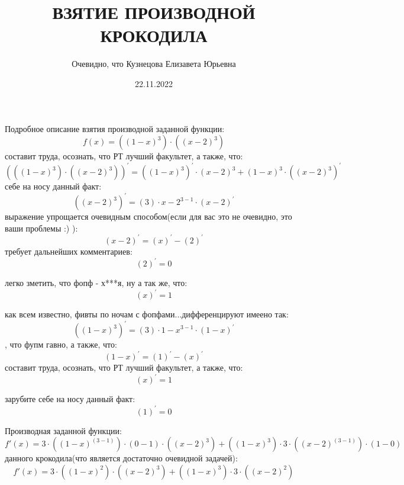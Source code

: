 \documentclass[12pt, letterpaper, twoside]{article}
\title{ВЗЯТИЕ ПРОИЗВОДНОЙ КРОКОДИЛА}
\author{Очевидно, что Кузнецова Елизавета Юрьевна}
\date{22.11.2022}
\begin{document}
\maketitle
\newpage
Подробное описание взятия производной заданной функции:
\[f(x) ={{({({1} - {x})}^{3})} \cdot {({({x} - {2})}^{3})}}\]\newline{} составит труда, осознать, что РТ лучший факультет, а также, что:\newline\newline\[{({{({({1} - {x})}^{3})} \cdot {({({x} - {2})}^{3})}})}^{'} = {({{({1} - {x})}^{3}})}^{'}\cdot {{({x} - {2})}^{3}} + {{({1} - {x})}^{3}}\cdot {({{({x} - {2})}^{3}})}^{'}\]
 себе на носу данный факт:\newline\newline\[{({{({x} - {2})}^{3}})}^{'} = ({3})\cdot {{{x} - {2}}}^{{3} - 1} \cdot{({{x} - {2}})}^{'}\]
 выражение упрощается очевидным способом(если для вас это не очевидно, это ваши проблемы :) ):\newline\newline\[{({{x} - {2}})}^{'} = {({x})}^{'} - {({2})}^{'}\]
 требует дальнейших комментариев:\newline
\[{(2)}^{'} = 0 \]

легко зметить, что фопф - х***я, ну а так же, что:\newline
\[{(x)}^{'} = 1 \]

как всем известно, фивты по ночам с фопфами...дифференцируют имеено так:\newline\newline\[{({{({1} - {x})}^{3}})}^{'} = ({3})\cdot {{{1} - {x}}}^{{3} - 1} \cdot{({{1} - {x}})}^{'}\]
, что фупм гавно, а также, что:\newline\newline\[{({{1} - {x}})}^{'} = {({1})}^{'} - {({x})}^{'}\]
 составит труда, осознать, что РТ лучший факультет, а также, что:\newline
\[{(x)}^{'} = 1 \]

зарубите себе на носу данный факт:\newline
\[{(1)}^{'} = 0 \]

Производная заданной функции:
\[f'(x) ={{{{{3} \cdot {({({1} - {x})}^{({3} - {1})})}} \cdot {({0} - {1})}} \cdot {({({x} - {2})}^{3})}} + {{({({1} - {x})}^{3})} \cdot {{{3} \cdot {({({x} - {2})}^{({3} - {1})})}} \cdot {({1} - {0})}}}}\]
\newline{} данного крокодила(что является достаточно очевидной задачей):
\[f'(x) ={{{{3} \cdot {({({1} - {x})}^{2})}} \cdot {({({x} - {2})}^{3})}} + {{({({1} - {x})}^{3})} \cdot {{3} \cdot {({({x} - {2})}^{2})}}}}\]
\newline\newline
\end{document}
